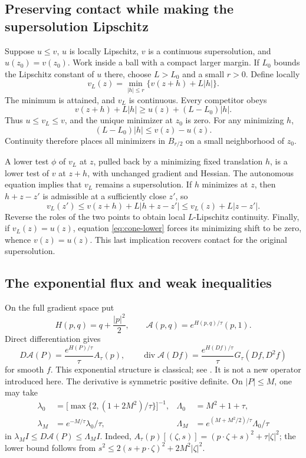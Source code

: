 \subsection{Preserving contact while making the supersolution Lipschitz}

Suppose $u\leq v$, $u$ is locally Lipschitz, $v$ is a continuous
supersolution, and $u(z_0)=v(z_0)$. Work inside a ball with a compact
larger margin. If $L_0$ bounds the Lipschitz constant of $u$ there,
choose $L>L_0$ and a small $r>0$. Define locally
\[
 v_L(z)=\min_{|h|\leq r}\{v(z+h)+L|h|\}.
\]
The minimum is attained, and $v_L$ is continuous. Every competitor
obeys
\begin{equation}\label{eq:cone-lower}
 v(z+h)+L|h|\geq u(z)+(L-L_0)|h|.
\end{equation}
Thus $u\leq v_L\leq v$, and the unique minimizer at $z_0$ is zero.
For any minimizing $h$,
\[
 (L-L_0)|h|\leq v(z)-u(z).
\]
Continuity therefore places all minimizers in $B_{r/2}$ on a small
neighborhood of $z_0$.

A lower test $\phi$ of $v_L$ at $z$, pulled back by a minimizing
fixed translation $h$, is a lower test of $v$ at $z+h$, with unchanged
gradient and Hessian. The autonomous equation implies that $v_L$
remains a supersolution. If $h$ minimizes at $z$, then
$h+z-z'$ is admissible at a sufficiently close $z'$, so
\[
 v_L(z')\leq v(z+h)+L|h+z-z'|
           \leq v_L(z)+L|z-z'|.
\]
Reverse the roles of the two points to obtain local $L$-Lipschitz
continuity. Finally, if $v_L(z)=u(z)$, equation
\eqref{eq:cone-lower} forces its minimizing shift to be zero, whence
$v(z)=u(z)$. This last implication recovers contact for the original
supersolution.

\subsection{The exponential flux and weak inequalities}

On the full gradient space put
\[
 H(p,q)=q+\frac{|p|^2}{2},\qquad
 \mathcal A(p,q)=e^{H(p,q)/\tau}(p,1).
\]
Direct differentiation gives
\begin{equation}\label{eq:exp-flux}
 D\mathcal A(P)=\frac{e^{H(P)/\tau}}{\tau}A_\tau(p),
 \qquad
 \operatorname{div}\mathcal A(Df)
       =\frac{e^{H(Df)/\tau}}{\tau}G_\tau(Df,D^2f)
\end{equation}
for smooth $f$. This exponential structure is classical; see
\cite{SanchezMorgado}. It is not a new operator introduced here.
The derivative is symmetric positive definite. On $|P|\leq M$, one
may take
\[
 \begin{aligned}
 \lambda_0&=\bigl[\max\{2,(1+2M^2)/\tau\}\bigr]^{-1},
 &\Lambda_0&=M^2+1+\tau,\\
 \lambda_M&=e^{-M/\tau}\lambda_0/\tau,
 &\Lambda_M&=e^{(M+M^2/2)/\tau}\Lambda_0/\tau
 \end{aligned}
\]
in $\lambda_MI\leq D\mathcal A(P)\leq\Lambda_MI$.
Indeed,
$A_\tau(p)[(\zeta,s)]=(p\cdot\zeta+s)^2+\tau|\zeta|^2$;
the lower bound follows from
$s^2\leq2(s+p\cdot\zeta)^2+2M^2|\zeta|^2$.

